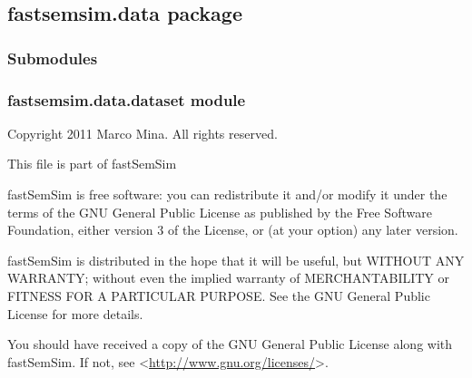 \documentclass[letterpaper,10pt,english]{sphinxmanual}
\begin{document}
\subsection{fastsemsim.data package}
\label{fastsemsim.data::doc}\label{fastsemsim.data:fastsemsim-data-package}

\subsubsection{Submodules}
\label{fastsemsim.data:submodules}

\subsubsection{fastsemsim.data.dataset module}
\label{fastsemsim.data:module-fastsemsim.data.dataset}\label{fastsemsim.data:fastsemsim-data-dataset-module}
Copyright 2011 Marco Mina. All rights reserved.

This file is part of fastSemSim

fastSemSim is free software: you can redistribute it and/or modify
it under the terms of the GNU General Public License as published by
the Free Software Foundation, either version 3 of the License, or
(at your option) any later version.

fastSemSim is distributed in the hope that it will be useful,
but WITHOUT ANY WARRANTY; without even the implied warranty of
MERCHANTABILITY or FITNESS FOR A PARTICULAR PURPOSE.  See the
GNU General Public License for more details.

You should have received a copy of the GNU General Public License
along with fastSemSim.  If not, see \textless{}\href{http://www.gnu.org/licenses/}{http://www.gnu.org/licenses/}\textgreater{}.
\end{document}

